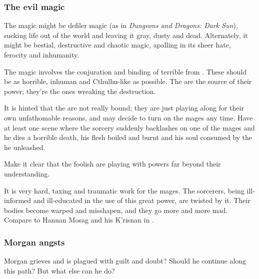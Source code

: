 \subsubsection{The evil magic}
The \Rungertemple{} magic might be defiler magic (as in \emph{Dungeons and Dragons: Dark Sun}), sucking life out of the world and leaving it gray, dusty and dead. Alternately, it might be bestial, destructive and chaotic magic, apalling in its sheer hate, ferocity and inhumanity. 

The magic involves the conjuration and binding of terrible \daemons{} from \Chaos. These should be as horrible, inhuman and Cthulhu-like as possible. The \daemons{} are the source of their power; they're the ones wreaking the destruction. 

It is hinted that the \daemons{} are not really bound; they are just playing along for their own unfathomable reasons, and may decide to turn on the mages any time. Have at least one scene where the sorcery suddenly backlashes on one of the mages and he dies a horrible death, his flesh boiled and burnt and his soul consumed by the \daemon{} he unleashed. 

Make it clear that the foolish \humans{} are playing with powers far beyond their understanding. 

It is very hard, taxing and traumatic work for the mages. The sorcerers, being ill-informed and ill-educated in the use of this great power, are twisted by it. Their bodies become warped and misshapen, and they go more and more mad. Compare to Hannan Mosag and his K'risnan in \cite{StevenEriksonIanCameronEsslemont:MalazanBookoftheFallen}.







\subsubsection{Morgan angsts}
Morgan grieves and is plagued with guilt and doubt? Should he continue along this path? But what else can he do? 

